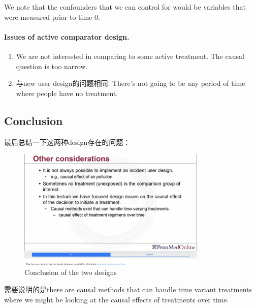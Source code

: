 We note that the confounders that we can control for would be variables that were measured prior to time 0.

\paragraph{Issues of active comparator design.} 
\begin{enumerate}[label=\arabic*.]
	\item We are not interested in comparing to some active treatment. The causal question is too narrow.
	\item 与new user design的问题相同. There's not going to be any period of time where people have no treatment.
\end{enumerate}

\subsection{Conclusion}
最后总结一下这两种design存在的问题：
\begin{figure}[htbp]
	\setlength{\abovecaptionskip}{0pt}     %
	\setlength{\belowcaptionskip}{10pt}
	\vspace{-0cm}  %
	\setlength{\abovecaptionskip}{-0cm}   %
	\setlength{\belowcaptionskip}{-0cm}   %
	\centering
	\includegraphics[width=0.8\textwidth]{figure/othercon.jpg} 
	\caption{Conclusion of the two designs}
	\label{othercon}
\end{figure} 

需要说明的是{\color{red}there are causal methods that can handle time variant treatments where we might be looking at the causal effects of treatments over time.}



